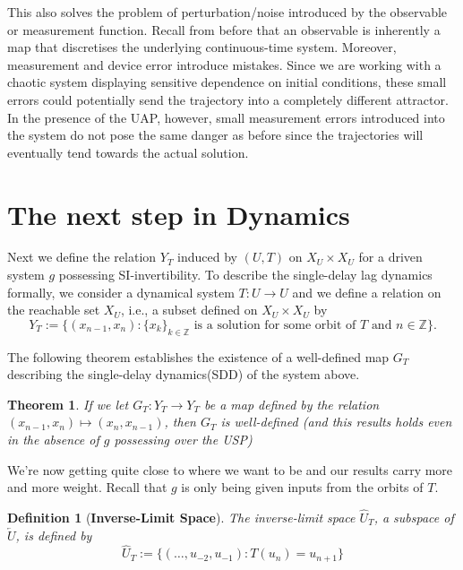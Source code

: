 \documentclass[a4paper,12pt,twoside]{report}
\newtheorem{Definition}{Definition}[]
\newtheorem{Theorem}{Theorem}[]
\begin{document}
This also solves the problem of perturbation/noise introduced by the observable or measurement function. Recall from before that an observable is inherently a map that discretises the underlying continuous-time system. Moreover, measurement and device error introduce mistakes. Since we are working with a chaotic system displaying sensitive dependence on initial conditions, these small errors could potentially send the trajectory into a completely different attractor. 
In the presence of the UAP, however, small measurement errors introduced into the system do not pose the same danger as before since the trajectories will eventually tend towards the actual solution.

\section{The next step in Dynamics}

Next we define the relation $Y_T$ induced by $(U,T)$ on $X_U\times{X_U}$ for a driven system $g$ possessing SI-invertibility.  To describe the  single-delay lag dynamics formally, we consider a dynamical system $T: U \to U$ and we define a relation on the reachable set $X_U$, i.e., a subset defined on $X_U \times X_U$ by 
$$Y_T:=\{(x_{n-1},x_n): \{x_k\}_{k\in \mathbb{Z}} \mbox{ is a solution for some orbit of } T \mbox{ and } n \in \mathbb{Z}\}.$$ 

The following theorem establishes the existence of a well-defined map $G_T$ describing the single-delay dynamics(SDD) of the system above. 

\begin{Theorem}
If we let $G_T:Y_T\to{Y_T}$ be a map defined by the relation $(x_{n-1},x_n)\mapsto(x_n,x_{n-1})$, then $G_T$ is well-defined (and this results holds even in the absence of $g$ possessing over the USP)  
\end{Theorem}

We're now getting quite close to where we want to be and our results carry more and more weight. Recall that $g$ is only being given inputs from the orbits of $T$.  

\begin{Definition}
  [\bf Inverse-Limit Space]\label{Dfn_InvLimSpace}\rm
  The inverse-limit space $\widehat{U}_T$, a subspace of $\overleftarrow{U}$, is defined by $$\widehat{U}_T:=\{(\ldots, u_{-2}, u_{-1}):T(u_n)=u_{n+1}\}$$ 
\end{Definition}
\end{document}
